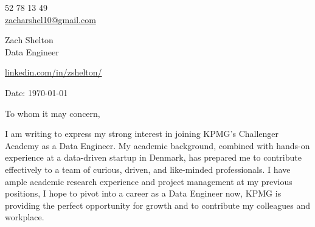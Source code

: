 \documentclass[11pt,a4]{article}
\begin{document}
\begin{center}
    \begin{minipage}[b]{0.24\textwidth}
            \large 52 78 13 49 \\
            \large \href{mailto:zshelton1997@gmail.com}{zacharshel10@gmail.com} 
    \end{minipage}%
    \begin{minipage}[b]{0.5\textwidth}
            \centering
            {\Huge Zach Shelton} \\ %
            \vspace{0.1cm}
            {\color{UI_blue} \Large{Data Engineer}} \\
    \end{minipage}%
    \begin{minipage}[b]{0.24\textwidth}
            \flushright \large
            {\href{https://www.linkedin.com/in/zshelton/}{linkedin.com/in/zshelton/} } \\

    \end{minipage}   
    
\vspace{-0.15cm} 
{\color{UI_blue} \hrulefill}
\end{center}

\justify
\setlength{\parindent}{0pt}
\setlength{\parskip}{12pt}
\vspace{0.1cm}


Date: \today \par \vspace{-0.1cm}

To whom it may concern,

I am writing to express my strong interest in joining KPMG's Challenger Academy as a Data Engineer. My academic background, combined with hands-on experience at a data-driven startup in Denmark, has prepared me to contribute effectively to a team of curious, driven, and like-minded professionals. I have ample academic research experience and project management at my previous positions, I hope to pivot into a career as a Data Engineer now, KPMG is providing the perfect opportunity for growth and to contribute my colleagues and workplace.
\end{document}

